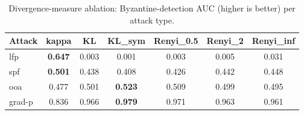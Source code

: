 \begin{table}[t]\centering\small
\caption{Divergence-measure ablation: Byzantine-detection AUC (higher is better) per attack type.}
\label{tab:divergence_ablation}
\begin{tabular}{lcccccc}
\toprule
Attack & kappa & KL & KL\_sym & Renyi\_0.5 & Renyi\_2 & Renyi\_inf \\
\midrule
lfp & \textbf{0.647} & 0.003 & 0.001 & 0.003 & 0.005 & 0.031 \\
spf & \textbf{0.501} & 0.438 & 0.408 & 0.426 & 0.442 & 0.448 \\
ooa & 0.477 & 0.501 & \textbf{0.523} & 0.509 & 0.499 & 0.495 \\
grad-p & 0.836 & 0.966 & \textbf{0.979} & 0.971 & 0.963 & 0.961 \\
\bottomrule
\end{tabular}
\end{table}
